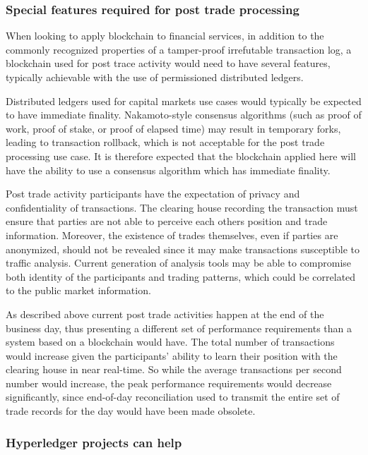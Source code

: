 \subsubsection{Special features required for post trade processing}

When looking to apply blockchain to financial services, in addition to the commonly recognized properties of a tamper-proof irrefutable transaction log, a blockchain used for post trace activity would need to have several features, typically achievable with the use of permissioned distributed ledgers.

Distributed ledgers used for capital markets use cases would typically be expected to have immediate finality. Nakamoto-style consensus algorithms (such as proof of work, proof of stake, or proof of elapsed time) may result in temporary forks, leading to transaction rollback, which is not acceptable for the post trade processing use case. It is therefore expected that the blockchain applied here will have the ability to use a consensus algorithm which has immediate finality.

Post trade activity participants have the expectation of privacy and confidentiality of transactions. The clearing house recording the transaction must ensure that parties are not able to perceive each others position and trade information. Moreover, the existence of trades themselves, even if parties are anonymized, should not be revealed since it may make transactions susceptible to traffic analysis. Current generation of analysis tools may be able to compromise both identity of the participants and trading patterns, which could be correlated to the public market information.

As described above current post trade activities happen at the end of the business day, thus presenting a different set of performance requirements than a system based on a blockchain would have. The total number of transactions would increase given the participants' ability to learn their position with the clearing house in near real-time. So while the average transactions per second number would increase, the peak performance requirements would decrease significantly, since end-of-day reconciliation used to transmit the entire set of trade records for the day would have been made obsolete.

\subsubsection{Hyperledger projects can help}

